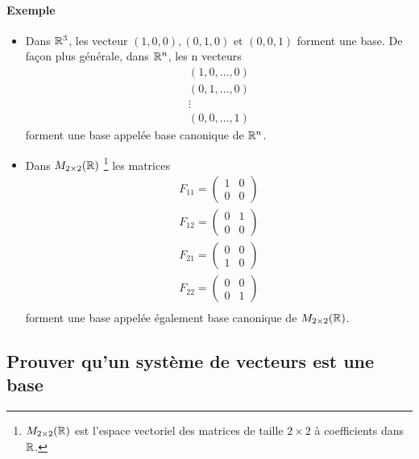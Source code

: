 \paragraph{Exemple}
\begin{itemize}
  \item Dans $\mathbb{R}^3$, les vecteur $(1, 0, 0), (0, 1, 0) \text{ et } (0, 0, 1)$ forment une base.  De façon plus générale, dans $\mathbb{R}^n$, les n vecteurs
    \begin{eqnarray*}
      &(1, 0, \ldots, 0)& \\
      &(0, 1, \ldots, 0)& \\
      &\vdots& \\
      &(0, 0, \ldots, 1)& 
    \end{eqnarray*}
    forment une base appelée base canonique de $\mathbb{R}^n$.
  \item Dans $M_{2\times 2}(\mathbb{R})$ \footnote{$M_{2\times 2}(\mathbb{R})$ est l'espace vectoriel des matrices de taille $2\times 2$ à coefficients dans $\mathbb{R}$.} les matrices 
    \begin{eqnarray*}
      F_{11} = \begin{pmatrix} 1 & 0 \\ 0 & 0 \end{pmatrix} \\
      F_{12} = \begin{pmatrix} 0 & 1 \\ 0 & 0 \end{pmatrix} \\
      F_{21} = \begin{pmatrix} 0 & 0 \\ 1 & 0 \end{pmatrix} \\
      F_{22} = \begin{pmatrix} 0 & 0 \\ 0 & 1 \end{pmatrix} \\
    \end{eqnarray*}
    forment une base appelée également base canonique de $M_{2 \times 2}(\mathbb{R})$.
\end{itemize}

%
\subsection{Prouver qu'un système de vecteurs est une base}
%
